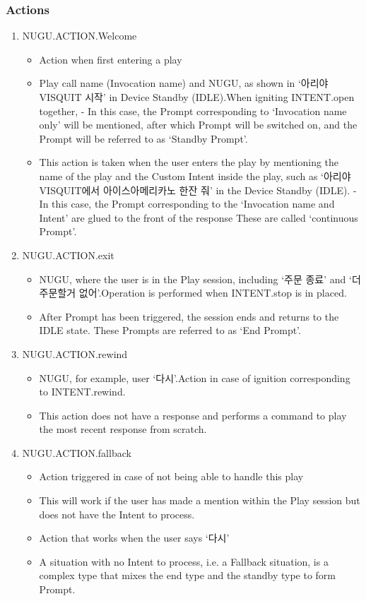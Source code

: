\documentclass[conference,compsoc]{IEEEtran}
\begin{document}
\subsubsection{Actions}
\begin{enumerate}
  \item NUGU.ACTION.Welcome
  \begin{itemize}
    \item Action when first entering a play
    \item Play call name (Invocation name) and NUGU, as shown in ‘아리야 VISQUIT 시작’ in Device Standby (IDLE).When igniting INTENT.open together, - In this case, the Prompt corresponding to ‘Invocation name only’ will be mentioned, after which Prompt will be switched on, and the Prompt will be referred to as ‘Standby Prompt’.
    \item This action is taken when the user enters the play by mentioning the name of the play and the Custom Intent inside the play, such as ‘아리야 VISQUIT에서 아이스아메리카노 한잔 줘’ in the Device Standby (IDLE). - In this case, the Prompt corresponding to the ‘Invocation name and Intent’ are glued to the front of the response These are called ‘continuous Prompt’.
  \end{itemize}
  
  \item NUGU.ACTION.exit
  \begin{itemize}
    \item NUGU, where the user is in the Play session, including ‘주문 종료’ and ‘더 주문할거 없어’.Operation is performed when INTENT.stop is in placed.
    \item After Prompt has been triggered, the session ends and returns to the IDLE state. These Prompts are referred to as ‘End Prompt’.
  \end{itemize}

  \item NUGU.ACTION.rewind
  \begin{itemize}
    \item NUGU, for example, user ‘다시’.Action in case of ignition corresponding to INTENT.rewind.
    \item This action does not have a response and performs a command to play the most recent response from scratch.
  \end{itemize}

  \item NUGU.ACTION.fallback
  \begin{itemize}
    \item Action triggered in case of not being able to handle this play
    \item This will work if the user has made a mention within the Play session but does not have the Intent to process.
    \item Action that works when the user says ‘다시’
    \item A situation with no Intent to process, i.e. a Fallback situation, is a complex type that mixes the end type and the standby type to form Prompt.
  \end{itemize}


\end{enumerate}
\end{document}
